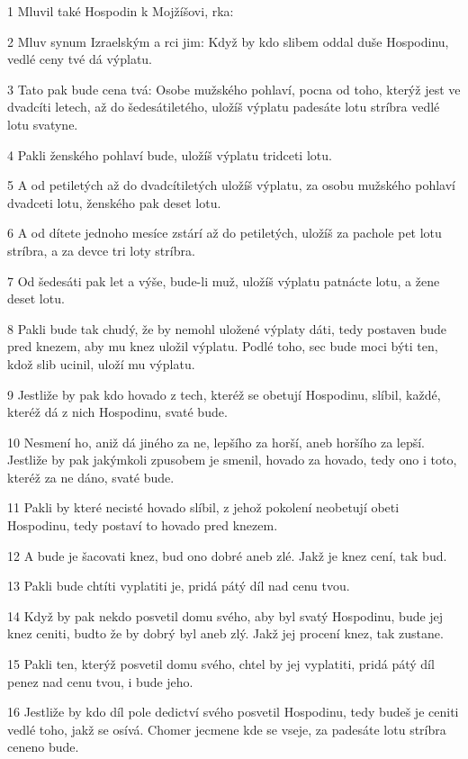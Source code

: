 \par 1 Mluvil také Hospodin k Mojžíšovi, rka:
\par 2 Mluv synum Izraelským a rci jim: Když by kdo slibem oddal duše Hospodinu, vedlé ceny tvé dá výplatu.
\par 3 Tato pak bude cena tvá: Osobe mužského pohlaví, pocna od toho, kterýž jest ve dvadcíti letech, až do šedesátiletého, uložíš výplatu padesáte lotu stríbra vedlé lotu svatyne.
\par 4 Pakli ženského pohlaví bude, uložíš výplatu tridceti lotu.
\par 5 A od petiletých až do dvadcítiletých uložíš výplatu, za osobu mužského pohlaví dvadceti lotu, ženského pak deset lotu.
\par 6 A od dítete jednoho mesíce zstárí až do petiletých, uložíš za pachole pet lotu stríbra, a za devce tri loty stríbra.
\par 7 Od šedesáti pak let a výše, bude-li muž, uložíš výplatu patnácte lotu, a žene deset lotu.
\par 8 Pakli bude tak chudý, že by nemohl uložené výplaty dáti, tedy postaven bude pred knezem, aby mu knez uložil výplatu. Podlé toho, sec bude moci býti ten, kdož slib ucinil, uloží mu výplatu.
\par 9 Jestliže by pak kdo hovado z tech, kteréž se obetují Hospodinu, slíbil, každé, kteréž dá z nich Hospodinu, svaté bude.
\par 10 Nesmení ho, aniž dá jiného za ne, lepšího za horší, aneb horšího za lepší. Jestliže by pak jakýmkoli zpusobem je smenil, hovado za hovado, tedy ono i toto, kteréž za ne dáno, svaté bude.
\par 11 Pakli by které necisté hovado slíbil, z jehož pokolení neobetují obeti Hospodinu, tedy postaví to hovado pred knezem.
\par 12 A bude je šacovati knez, bud ono dobré aneb zlé. Jakž je knez cení, tak bud.
\par 13 Pakli bude chtíti vyplatiti je, pridá pátý díl nad cenu tvou.
\par 14 Když by pak nekdo posvetil domu svého, aby byl svatý Hospodinu, bude jej knez ceniti, budto že by dobrý byl aneb zlý. Jakž jej procení knez, tak zustane.
\par 15 Pakli ten, kterýž posvetil domu svého, chtel by jej vyplatiti, pridá pátý díl penez nad cenu tvou, i bude jeho.
\par 16 Jestliže by kdo díl pole dedictví svého posvetil Hospodinu, tedy budeš je ceniti vedlé toho, jakž se osívá. Chomer jecmene kde se vseje, za padesáte lotu stríbra ceneno bude.
